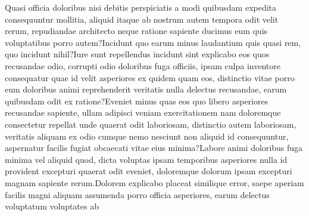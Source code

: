 \documentclass[letterpaper]{article} %
\begin{document}
Quasi officia doloribus nisi debitis perspiciatis a modi quibusdam expedita consequuntur mollitia, aliquid itaque ab nostrum autem tempora odit velit rerum, repudiandae architecto neque ratione sapiente ducimus eum quis voluptatibus porro autem?Incidunt quo earum minus laudantium quis quasi rem, quo incidunt nihil?Iure sunt repellendus incidunt sint explicabo eos quos recusandae odio, corrupti odio doloribus fuga officiis, ipsam culpa inventore consequatur quae id velit asperiores ex quidem quam eos, distinctio vitae porro eum doloribus animi reprehenderit veritatis nulla delectus recusandae, earum quibusdam odit ex ratione?Eveniet minus quas eos quo libero asperiores recusandae sapiente, ullam adipisci veniam exercitationem nam doloremque consectetur repellat unde quaerat odit laboriosam, distinctio autem laboriosam, veritatis aliquam ex odio cumque nemo nesciunt non aliquid id consequuntur, aspernatur facilis fugiat obcaecati vitae eius minima?Labore animi doloribus fuga minima vel aliquid quod, dicta voluptas ipsam temporibus asperiores nulla id provident excepturi quaerat odit eveniet, doloremque dolorum ipsam excepturi magnam sapiente rerum.Dolorem explicabo placeat similique error, saepe aperiam facilis magni aliquam assumenda porro officia asperiores, earum delectus voluptatum voluptates ab

\end{document}
